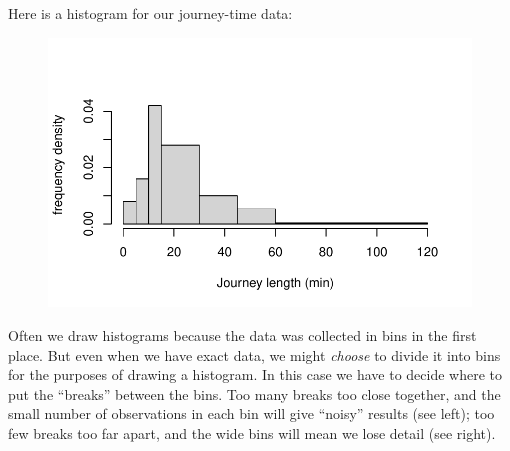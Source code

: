 \documentclass[
  letterpaper,
]{report}
\newenvironment{Shaded}{\begin{snugshade}}{\end{snugshade}}
\newcommand{\AttributeTok}[1]{\textcolor[rgb]{0.40,0.45,0.13}{#1}}
\newcommand{\DecValTok}[1]{\textcolor[rgb]{0.68,0.00,0.00}{#1}}
\newcommand{\FunctionTok}[1]{\textcolor[rgb]{0.28,0.35,0.67}{#1}}
\newcommand{\NormalTok}[1]{\textcolor[rgb]{0.00,0.23,0.31}{#1}}
\newcommand{\OtherTok}[1]{\textcolor[rgb]{0.00,0.23,0.31}{#1}}
\newcommand{\SpecialCharTok}[1]{\textcolor[rgb]{0.37,0.37,0.37}{#1}}
\newcommand{\StringTok}[1]{\textcolor[rgb]{0.13,0.47,0.30}{#1}}
\theoremstyle{definition}
\theoremstyle{definition}
\theoremstyle{remark}
\begin{document}
Here is a histogram for our journey-time data:

\begin{Shaded}
\end{Shaded}

\begin{figure}[H]

{\centering \includegraphics{sections/L02-dataviz_files/figure-pdf/journeys-1.pdf}

}

\end{figure}

Often we draw histograms because the data was collected in bins in the
first place. But even when we have exact data, we might \emph{choose} to
divide it into bins for the purposes of drawing a histogram. In this
case we have to decide where to put the ``breaks'' between the bins. Too
many breaks too close together, and the small number of observations in
each bin will give ``noisy'' results (see left); too few breaks too far
apart, and the wide bins will mean we lose detail (see right).
\end{document}
